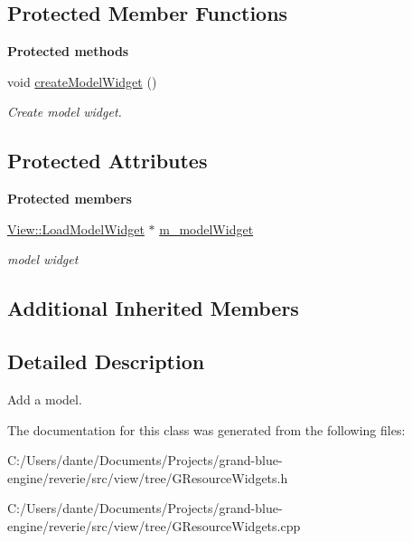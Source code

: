 \subsection*{Protected Member Functions}
\begin{Indent}\textbf{ Protected methods}\par
\begin{DoxyCompactItemize}
\item 
\mbox{\label{classrev_1_1_load_model_command_a739f736a76a6d96d7a1d78ed612bf170}} 
void \mbox{\hyperlink{classrev_1_1_load_model_command_a739f736a76a6d96d7a1d78ed612bf170}{create\+Model\+Widget}} ()
\begin{DoxyCompactList}\small\item\em Create model widget. \end{DoxyCompactList}\end{DoxyCompactItemize}
\end{Indent}
\subsection*{Protected Attributes}
\begin{Indent}\textbf{ Protected members}\par
\begin{DoxyCompactItemize}
\item 
\mbox{\label{classrev_1_1_load_model_command_a600e1f6756490b19ebe1fd71e9bef1e9}} 
\mbox{\hyperlink{classrev_1_1_view_1_1_load_model_widget}{View\+::\+Load\+Model\+Widget}} $\ast$ \mbox{\hyperlink{classrev_1_1_load_model_command_a600e1f6756490b19ebe1fd71e9bef1e9}{m\+\_\+model\+Widget}}
\begin{DoxyCompactList}\small\item\em model widget \end{DoxyCompactList}\end{DoxyCompactItemize}
\end{Indent}
\subsection*{Additional Inherited Members}


\subsection{Detailed Description}
Add a model. 

The documentation for this class was generated from the following files\+:\begin{DoxyCompactItemize}
\item 
C\+:/\+Users/dante/\+Documents/\+Projects/grand-\/blue-\/engine/reverie/src/view/tree/G\+Resource\+Widgets.\+h\item 
C\+:/\+Users/dante/\+Documents/\+Projects/grand-\/blue-\/engine/reverie/src/view/tree/G\+Resource\+Widgets.\+cpp\end{DoxyCompactItemize}
